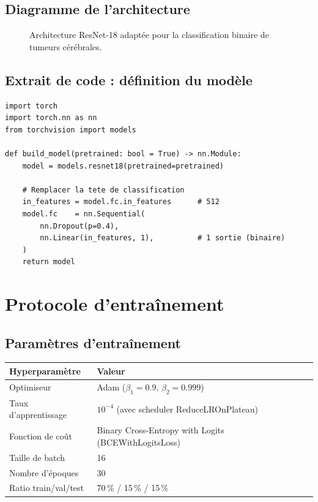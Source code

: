 \documentclass[12pt, a4paper]{report}
\begin{document}
\subsection{Diagramme de l'architecture}

\begin{figure}[h]
  \centering
  \caption{Architecture ResNet-18 adaptée pour la classification binaire de tumeurs cérébrales.}
  \label{fig:resnet_arch}
\end{figure}

\subsection{Extrait de code : définition du modèle}

\begin{lstlisting}[style=pythonStyle, caption={Adaptation de ResNet-18 pour la classification binaire.}]
import torch
import torch.nn as nn
from torchvision import models

def build_model(pretrained: bool = True) -> nn.Module:
    model = models.resnet18(pretrained=pretrained)

    # Remplacer la tete de classification
    in_features = model.fc.in_features      # 512
    model.fc    = nn.Sequential(
        nn.Dropout(p=0.4),
        nn.Linear(in_features, 1),          # 1 sortie (binaire)
    )
    return model
\end{lstlisting}

\section{Protocole d'entraînement}

\subsection{Paramètres d'entraînement}

\begin{center}
\begin{tabular}{@{}ll@{}}
  \toprule
  \textbf{Hyperparamètre} & \textbf{Valeur} \\
  \midrule
  Optimiseur        & Adam ($\beta_1=0.9$, $\beta_2=0.999$) \\
  Taux d'apprentissage & $10^{-4}$ (avec scheduler ReduceLROnPlateau) \\
  Fonction de coût  & Binary Cross-Entropy with Logits (BCEWithLogitsLoss) \\
  Taille de batch   & 16 \\
  Nombre d'époques  & 30 \\
  Ratio train/val/test & 70\,\% / 15\,\% / 15\,\% \\
  \bottomrule
\end{tabular}
\end{center}
\end{document}
